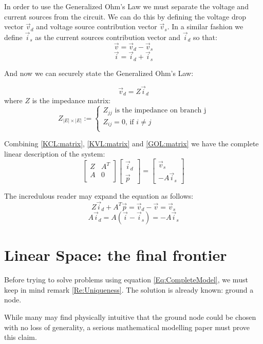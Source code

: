 \documentclass{comjnl}
\begin{document}
In order to use the Generalized Ohm's Law we must separate the voltage and current sources from the circuit. We can do this by defining the voltage drop vector $\vec{v}_{d}$ and voltage source contribution vector $\vec{v}_{s}$. In a similar fashion we define $\vec{i}_{s}$ as the current sources contribution vector and $\vec{i}_{d}$ so that:
$$ \vec{v} = \vec{v}_{d} - \vec{v}_{s}$$
$$ \vec{i} = \vec{i}_{d} +  \vec{i}_{s}$$

And now we can securely state the Generalized Ohm's Law:
\begin{theorem}[GOL]
\label{GOL:matrix}
$$ \vec{v}_{d} = Z \vec{i}_{d} $$
where $Z$ is the impedance matrix:
$$ Z_{|E|\times|E|} :=
\begin{cases} 
Z_{jj} \mbox{ is the impedance on branch j}\\
Z_{ij}=0 \mbox{, if } i\neq j \\
\end{cases}$$
\end{theorem}
Combining \ref{KCL:matrix}, \ref{KVL:matrix} and \ref{GOL:matrix} we have the complete linear description of the system:
\begin{equation}
\label{Eq:CompleteModel}
\begin{bmatrix}
	Z & A^T \\
	A & 0   \\
\end{bmatrix}
\begin{bmatrix}
	\vec{i}_d \\
	\vec{p}
\end{bmatrix}
=
\begin{bmatrix}
	\vec{v}_s \\
	-A\vec{i}_s
\end{bmatrix}
\end{equation}

The incredulous reader may expand the equation as follows:
$$ Z\vec{i}_d + A^T\vec{p} = \vec{v}_d - \vec{v} = \vec{v}_s $$
$$ A\vec{i}_d = A(\vec{i}-\vec{i}_s) = - A\vec{i}_s  $$

\section{Linear Space: the final frontier}
Before trying to solve problems using equation \ref{Eq:CompleteModel}, we must keep in mind remark \ref{Re:Uniqueness}. The solution is already known: ground a node.

While many may find physically intuitive that the ground node could be chosen with no loss of generality, a serious mathematical modelling paper must prove this claim. 
\end{document}
